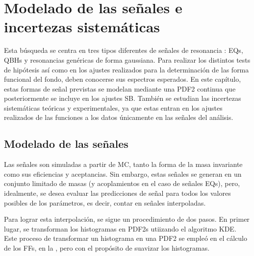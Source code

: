 \chapter{Modelado de las señales e incertezas sistem\'aticas}
\label{ch:signals}


Esta búsqueda se centra en tres tipos diferentes de señales de resonancia \gammajet: \acp{EQ}, \acp{QBH} y resonancias genéricas de forma gaussiana. Para realizar los distintos tests de hipótesis así como en los ajustes realizados para la determinación de las forma funcional del fondo, deben conocerse sus espectros \myj esperados.
En este capítulo, estas formas de señal previstas se modelan mediante una \ac{PDF2} continua que posteriormente se incluye en los ajustes \ac{SB}.
También se estudian las incertezas sistemáticas teóricas y experimentales, ya que estas entran en los ajustes realizados de las funciones a los datos \'unicamente en las señales del an\'alisis.













\section{Modelado de las señales}
\label{sec:signals:modeling}

Las señales son simuladas a partir de \ac{MC}, tanto la forma de la masa invariante como sus eficiencias y aceptancias. Sin embargo, estas señales se generan en un conjunto limitado de masas (y acoplamientos en el caso de señales \acp{EQ}), pero, idealmente, se desea evaluar las predicciones de señal para todos los valores posibles de los parámetros, es decir, contar en señales interpoladas.

Para lograr esta interpolación, se sigue un procedimiento de dos pasos. En primer lugar, se transforman los histogramas en \acp{PDF2} utiizando el algoritmo \ac{KDE}. Este proceso de transformar un histograma en una \ac{PDF2} se empleó en el cálculo de los \acp{FF}, en la \Sect{\ref{subsec:ss_corrections:ffs:calculation}}, pero con el propósito de suavizar los histogramas.


